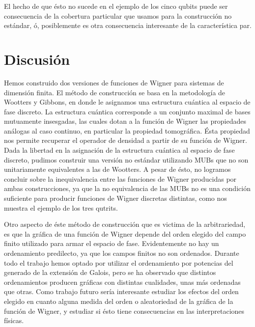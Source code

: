 \documentclass[a4paper]{report}
\begin{document}
  El hecho de que ésto no sucede en el ejemplo de los cinco
  qubits puede ser consecuencia de la cobertura particular
  que usamos para la construcción no estándar, ó,
  posiblemente es otra consecuencia interesante de la
  característica par. 

  \clearpage
  \section{Discusión}

  Hemos construido dos versiones de funciones de Wigner para
  sistemas de dimensión finita. El método de construcción se
  basa en la metodología de Wootters y Gibbons, en donde le
  asignamos una estructura cuántica al espacio de fase
  discreto. La estructura cuántica corresponde a un conjunto
  maximal de bases mutuamente insesgadas, las cuales dotan a
  la función de Wigner las propiedades análogas al caso
  continuo, en particular la propiedad tomográfica.
  Ésta propiedad nos permite recuperar el operador de
  densidad a partir de su función de Wigner. Dada la
  libertad en la asignación de la estructura cuántica al
  espacio de fase discreto, pudimos construir una versión no
  estándar utilizando MUBs que no son unitariamente
  equivalentes a las de Wootters. A pesar de ésto, no
  logramos concluir sobre la inequivalencia entre las
  funciones de Wigner producidas por ambas construcciones,
  ya que la no equivalencia de las MUBs no es una condición
  suficiente para producir funciones de Wigner discretas
  distintas, como nos muestra el ejemplo de los tres
  qutrits.

  Otro aspecto de éste método de construcción que es victima
  de la arbitrariedad, es que la gráfica de una función de
  Wigner depende del orden elegido del campo finito
  utilizado para armar el espacio de fase. Evidentemente no
  hay un ordenamiento predilecto, ya que los campos finitos
  no son ordenados.  Durante todo el trabajo hemos optado
  por utilizar el ordenamiento por potencias del generado de
  la extensión de Galois, pero se ha observado que distintos
  ordenamientos producen gráficas con distintas cualidades,
  unas más ordenadas que otras. Como trabajo futuro sería
  interesante estudiar los efectos del orden elegido en
  cuanto alguna medida del orden o aleatoriedad de la
  gráfica de la función de Wigner, y estudiar si ésto tiene
  consecuencias en las interpretaciones físicas.
\end{document}
